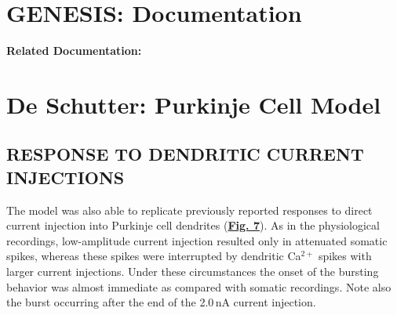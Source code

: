 \documentclass[12pt]{article}
\begin{document}
\section*{GENESIS: Documentation}

{\bf Related Documentation:}

\section*{De Schutter: Purkinje Cell Model}

\subsection*{RESPONSE TO DENDRITIC CURRENT INJECTIONS}

The model was also able to replicate previously reported responses to
direct current injection into Purkinje cell dendrites (\href{../pub-purkinje-deschutter1-fig-7/pub-purkinje-deschutter1-fig-7.tex}{\bf Fig.
7}). As in the physiological recordings, low-amplitude
current injection resulted only in attenuated somatic
spikes, whereas these spikes were interrupted by dendritic
Ca$^{2+}$ spikes with larger current injections. Under these circumstances
the onset of the bursting behavior was almost
immediate as compared with somatic recordings. Note also
the burst occurring after the end of the 2.0\,nA current injection.



\end{document}
